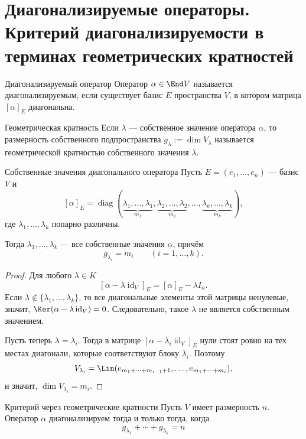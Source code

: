
\section{Диагонализируемые операторы. Критерий диагонализируемости в терминах геометрических кратностей}

\begin{Definition}{Диагонализируемый оператор}{}
	Оператор $\alpha\in\End V$ называется диагонализируемым, если существует базис $E$ пространства $V$, в котором матрица $[\alpha]_E$ диагональна.
\end{Definition}

\begin{Definition}{Геометрическая кратность}{}
	Если $\lambda$ --- собственное значение оператора $\alpha$, то размерность собственного подпространства $g_\lambda:=\dim V_\lambda$ называется геометрической кратностью собственного значения $\lambda$.
\end{Definition}

\begin{Lemma}{Собственные значения диагонального оператора}{}
	Пусть $E=(e_1,\ldots,e_n)$ --- базис $V$ и
	\[
	[\alpha]_E=
	\operatorname{diag}(
	\underbrace{\lambda_1,\ldots,\lambda_1}_{m_1},
	\underbrace{\lambda_2,\ldots,\lambda_2}_{m_2},
	\ldots,
	\underbrace{\lambda_k,\ldots,\lambda_k}_{m_k}
	),
	\]
	где $\lambda_1,\ldots,\lambda_k$ попарно различны.
	
	Тогда $\lambda_1,\ldots,\lambda_k$ --- все собственные значения $\alpha$, причём
	\[
	g_{\lambda_i}=m_i
	\qquad
	(i=1,\ldots,k).
	\]
\end{Lemma}

\begin{proof}
	Для любого $\lambda\in K$
	\[
	[\alpha-\lambda\operatorname{id}_V]_E
	=
	[\alpha]_E-\lambda I_n.
	\]
	Если $\lambda\notin\{\lambda_1,\ldots,\lambda_k\}$, то все диагональные элементы этой матрицы ненулевые, значит,
	$\Ker(\alpha-\lambda\operatorname{id}_V)=0$.
	Следовательно, такое $\lambda$ не является собственным значением.
	
	Пусть теперь $\lambda=\lambda_i$.
	Тогда в матрице $[\alpha-\lambda_i\operatorname{id}_V]_E$ нули стоят ровно на тех местах диагонали, которые соответствуют блоку $\lambda_i$.
	Поэтому
	\[
	V_{\lambda_i}
	=
	\Lin(e_{m_1+\cdots+m_{i-1}+1},\ldots,e_{m_1+\cdots+m_i}),
	\]
	и значит, $\dim V_{\lambda_i}=m_i$.
\end{proof}

\begin{Theorem}{Критерий через геометрические кратности}{}
	Пусть $V$ имеет размерность $n$. Оператор $\alpha$ диагонализируем тогда и только тогда, когда 
	\[
	g_{\lambda_1}+\cdots+g_{\lambda_k}=n
	\]
\end{Theorem}

